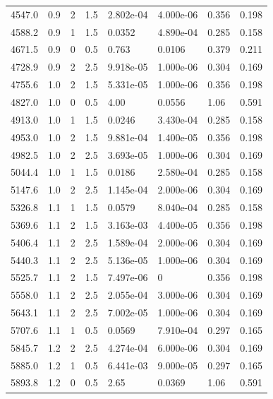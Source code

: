 \documentclass[preview]{standalone}
\begin{document}
{{{\begin{tabular}{L{1.2cm}C{1.2cm} C{0.3cm}C{0.5cm} C{1.4cm}C{1.4cm} C{1.4cm}C{1.4cm}}
  4547.0  &   0.9  & 2     & 1.5 &  2.802e-04  & 4.000e-06  & 0.356 &  0.198   \\ 
  4588.2  &   0.9  & 1     & 1.5 &  0.0352  & 4.890e-04  & 0.285 &  0.158   \\ 
  4671.5  &   0.9  & 0     & 0.5 &  0.763  & 0.0106  & 0.379 &  0.211   \\ 
  4728.9  &   0.9  & 2     & 2.5 &  9.918e-05  & 1.000e-06  & 0.304 &  0.169   \\ 
  4755.6  &   1.0  & 2     & 1.5 &  5.331e-05  & 1.000e-06  & 0.356 &  0.198   \\ 
  4827.0  &   1.0  & 0     & 0.5 &  4.00  & 0.0556  & 1.06 &  0.591   \\ 
  4913.0  &   1.0  & 1     & 1.5 &  0.0246  & 3.430e-04  & 0.285 &  0.158   \\ 
  4953.0  &   1.0  & 2     & 1.5 &  9.881e-04  & 1.400e-05  & 0.356 &  0.198   \\ 
  4982.5  &   1.0  & 2     & 2.5 &  3.693e-05  & 1.000e-06  & 0.304 &  0.169   \\ 
  5044.4  &   1.0  & 1     & 1.5 &  0.0186  & 2.580e-04  & 0.285 &  0.158   \\ 
  5147.6  &   1.0  & 2     & 2.5 &  1.145e-04  & 2.000e-06  & 0.304 &  0.169   \\ 
  5326.8  &   1.1  & 1     & 1.5 &  0.0579  & 8.040e-04  & 0.285 &  0.158   \\ 
  5369.6  &   1.1  & 2     & 1.5 &  3.163e-03  & 4.400e-05  & 0.356 &  0.198   \\ 
  5406.4  &   1.1  & 2     & 2.5 &  1.589e-04  & 2.000e-06  & 0.304 &  0.169   \\ 
  5440.3  &   1.1  & 2     & 2.5 &  5.136e-05  & 1.000e-06  & 0.304 &  0.169   \\ 
  5525.7  &   1.1  & 2     & 1.5 &  7.497e-06  & 0  & 0.356 &  0.198   \\ 
  5558.0  &   1.1  & 2     & 2.5 &  2.055e-04  & 3.000e-06  & 0.304 &  0.169   \\ 
  5643.1  &   1.1  & 2     & 2.5 &  7.002e-05  & 1.000e-06  & 0.304 &  0.169   \\ 
  5707.6  &   1.1  & 1     & 0.5 &  0.0569  & 7.910e-04  & 0.297 &  0.165   \\ 
  5845.7  &   1.2  & 2     & 2.5 &  4.274e-04  & 6.000e-06  & 0.304 &  0.169   \\ 
  5885.0  &   1.2  & 1     & 0.5 &  6.441e-03  & 9.000e-05  & 0.297 &  0.165   \\ 
  5893.8  &   1.2  & 0     & 0.5 &  2.65  & 0.0369  & 1.06 &  0.591   \\ 

\end{tabular}}}}
\end{document}
